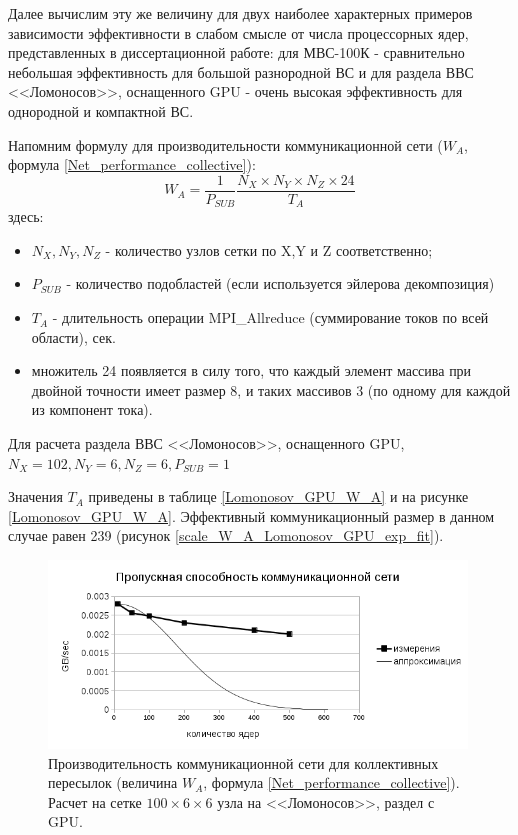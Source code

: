  Далее вычислим эту же величину для двух наиболее характерных примеров зависимости эффективности в слабом смысле от числа процессорных ядер, представленных в диссертационной работе: для МВС-100К - сравнительно небольшая эффективность для большой разнородной ВС и для раздела ВВС <<Ломоносов>>, оснащенного GPU - очень высокая эффективность для однородной и компактной ВС. 
 
 Напомним формулу для производительности коммуникационной сети ($W_A$, формула \ref{Net_performance_collective}):
 $$
 W_A = \frac{1}{P_{SUB}}\frac{N_X\times N_Y \times N_Z \times 24}{T_A}
 $$
 здесь:
 \begin{itemize}
 	\item $N_X, N_Y, N_Z$ - количество узлов сетки по X,Y и Z соответственно;
 	\item $P_{SUB}$ - количество подобластей (если используется эйлерова декомпозиция)
 	\item $T_{A}$ - длительность операции MPI\_Allreduce (суммирование токов по всей области), сек.
 	\item множитель 24 появляется в силу того, что каждый элемент массива при двойной точности имеет размер 8, и таких массивов 3 (по одному для каждой из компонент тока).
 \end{itemize}	
  
 Для расчета раздела ВВС <<Ломоносов>>, оснащенного GPU, $N_X = 102, N_Y = 6, N_Z = 6, P_{SUB}  = 1$
 
 Значения $T_A$ приведены в таблице \ref{Lomonosov_GPU_W_A} и на рисунке \ref{Lomonosov_GPU_W_A}. Эффективный коммуникационный размер в данном случае равен 239 (рисунок \ref{scale_W_A_Lomonosov_GPU_exp_fit}).
 
 
 \begin{figure}[h]
 	
 	
 	\begin{center}
 		\includegraphics[height=5cm,keepaspectratio]{images/W_A_Lomonosov_Gauss.png}
 		\caption{
 			Производительность коммуникационной сети для коллективных пересылок (величина $W_A$, формула \ref{Net_performance_collective}). Расчет на сетке $100 \times 6 \times 6$ узла на <<Ломоносов>>, раздел с GPU. 
 		}
 		\label{scale_W_A_Lomonosov}
 	\end{center} 
 \end{figure}
 

